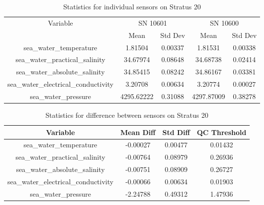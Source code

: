 \begin{table}[h]
\centering
\begin{tabular}{|c|c|c|c|c|}
\hline
Variable & \multicolumn{2}{c|}{SN 10601} & \multicolumn{2}{c|}{SN 10600} \\
& Mean & Std Dev & Mean & Std Dev \\
\hline
sea\_water\_temperature & 1.81504 & 0.00337 & 1.81531 & 0.00338 \\
sea\_water\_practical\_salinity & 34.67974 & 0.08648 & 34.68738 & 0.02414 \\
sea\_water\_absolute\_salinity & 34.85415 & 0.08242 & 34.86167 & 0.03381 \\
sea\_water\_electrical\_conductivity & 3.20708 & 0.00634 & 3.20774 & 0.00027 \\
sea\_water\_pressure & 4295.62222 & 0.31088 & 4297.87009 & 0.38278 \\
\hline
\end{tabular}
\caption{Statistics for individual sensors on Stratus 20}
\end{table}

\begin{table}[h]
\centering
\begin{tabular}{|c|c|c|c|}
\hline
Variable & Mean Diff & Std Diff & QC Threshold \\
\hline
sea\_water\_temperature & -0.00027 & 0.00477 & 0.01432 \\
sea\_water\_practical\_salinity & -0.00764 & 0.08979 & 0.26936 \\
sea\_water\_absolute\_salinity & -0.00751 & 0.08909 & 0.26727 \\
sea\_water\_electrical\_conductivity & -0.00066 & 0.00634 & 0.01903 \\
sea\_water\_pressure & -2.24788 & 0.49312 & 1.47936 \\
\hline
\end{tabular}
\caption{Statistics for difference between sensors on Stratus 20}
\end{table}
